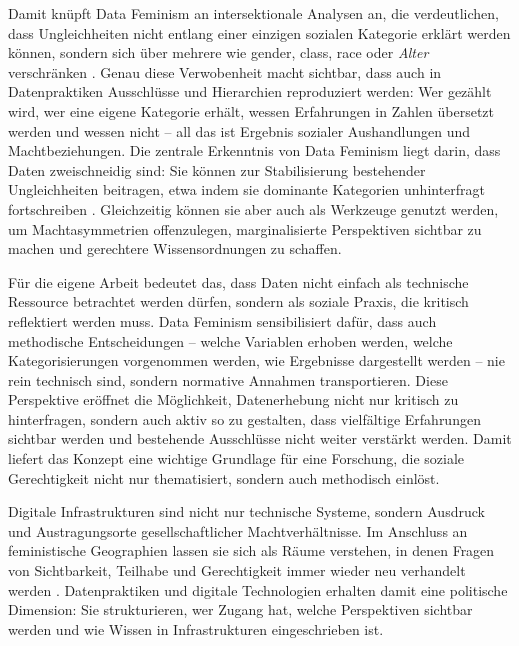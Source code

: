 Damit knüpft Data Feminism an intersektionale Analysen an, die verdeutlichen, dass Ungleichheiten nicht entlang einer einzigen sozialen Kategorie erklärt werden können, sondern sich über mehrere  wie \gls{gender}, \gls{class}, \gls{race} oder \emph{Alter} verschränken \parencite[\gls{vgl}][\gls{s}~131ff.]{dignazioDataFeminism2020}. Genau diese Verwobenheit macht sichtbar, dass auch in Datenpraktiken Ausschlüsse und Hierarchien reproduziert werden: Wer gezählt wird, wer eine eigene Kategorie erhält, wessen Erfahrungen in Zahlen übersetzt werden und wessen nicht -- all das ist Ergebnis sozialer Aushandlungen und Machtbeziehungen. Die zentrale Erkenntnis von Data Feminism liegt darin, dass Daten zweischneidig sind: Sie können zur Stabilisierung bestehender Ungleichheiten beitragen, etwa indem sie dominante Kategorien unhinterfragt fortschreiben \parencite[\gls{vgl}][\gls{s}~27]{dignazioDataFeminism2020}. Gleichzeitig können sie aber auch als Werkzeuge genutzt werden, um Machtasymmetrien offenzulegen, marginalisierte Perspektiven sichtbar zu machen und gerechtere Wissensordnungen zu schaffen.

Für die eigene Arbeit bedeutet das, dass Daten nicht einfach als technische Ressource betrachtet werden dürfen, sondern als soziale Praxis, die kritisch reflektiert werden muss. Data Feminism sensibilisiert dafür, dass auch methodische Entscheidungen -- welche Variablen erhoben werden, welche Kategorisierungen vorgenommen werden, wie Ergebnisse dargestellt werden -- nie rein technisch sind, sondern normative Annahmen transportieren. Diese Perspektive eröffnet die Möglichkeit, Datenerhebung nicht nur kritisch zu hinterfragen, sondern auch aktiv so zu gestalten, dass vielfältige Erfahrungen sichtbar werden und bestehende Ausschlüsse nicht weiter verstärkt werden. Damit liefert das Konzept eine wichtige Grundlage für eine Forschung, die soziale Gerechtigkeit nicht nur thematisiert, sondern auch methodisch einlöst.

\vspace{1em}

Digitale Infrastrukturen sind nicht nur technische Systeme, sondern Ausdruck und Austragungsorte gesellschaftlicher Machtverhältnisse. Im Anschluss an feministische Geographien lassen sie sich als Räume verstehen, in denen Fragen von Sichtbarkeit, Teilhabe und Gerechtigkeit immer wieder neu verhandelt werden \parencite{elwoodFeministDigitalGeographies2018}. Datenpraktiken und digitale Technologien erhalten damit eine politische Dimension: Sie strukturieren, wer Zugang hat, welche Perspektiven sichtbar werden und wie Wissen in Infrastrukturen eingeschrieben ist.

